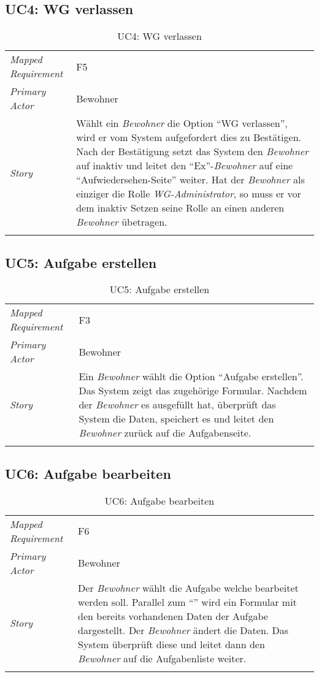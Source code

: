 \subsection{UC4: WG verlassen}\label{subsec:uc4}
\begin{table}[H]
	\tablestyle
	\tablealtcolored
	\begin{tabularx}{\textwidth}{lX}
		\tablebody
			\textit{Mapped Requirement} &
			F5
			\tabularnewline
			\textit{Primary Actor} &
			Bewohner
			\tabularnewline
			\textit{Story} &
			Wählt ein \emph{Bewohner} die Option ``WG verlassen'', wird er vom System aufgefordert dies zu Bestätigen. Nach der Bestätigung setzt das System den \emph{Bewohner} auf inaktiv und leitet den ``Ex''-\emph{Bewohner} auf eine ``Aufwiedersehen-Seite'' weiter. \newline
			Hat der \emph{Bewohner} als einziger die Rolle \emph{WG-Administrator}, so muss er vor dem inaktiv Setzen seine Rolle an einen anderen \emph{Bewohner} übetragen.
			\tabularnewline
		\tableend
	\end{tabularx}
	\caption{UC4: WG verlassen}
\end{table}


\subsection{UC5: Aufgabe erstellen}\label{subsec:uc5}
\begin{table}[H]
	\tablestyle
	\tablealtcolored
	\begin{tabularx}{\textwidth}{lX}
		\tablebody
			\textit{Mapped Requirement} &
			F3
			\tabularnewline
			\textit{Primary Actor} &
			Bewohner
			\tabularnewline
			\textit{Story} &
			Ein \emph{Bewohner} wählt die Option ``Aufgabe erstellen''. Das System zeigt das zugehörige Formular. Nachdem der \emph{Bewohner} es ausgefüllt hat, überprüft das System die Daten, speichert es und leitet den \emph{Bewohner} zurück auf die Aufgabenseite.
			\tabularnewline
		\tableend
	\end{tabularx}
	\caption{UC5: Aufgabe erstellen}
\end{table}


\subsection{UC6: Aufgabe bearbeiten}\label{subsec:uc6}
\begin{table}[H]
	\tablestyle
	\tablealtcolored
	\begin{tabularx}{\textwidth}{lX}
		\tablebody
			\textit{Mapped Requirement} &
			F6
			\tabularnewline
			\textit{Primary Actor} &
			Bewohner
			\tabularnewline
			\textit{Story} &
			Der \emph{Bewohner} wählt die Aufgabe welche bearbeitet werden soll. Parallel zum ``\nameref{subsec:uc5}'' wird ein Formular mit den bereits vorhandenen Daten der Aufgabe dargestellt. Der \emph{Bewohner} ändert die Daten. Das System überprüft diese und leitet dann den \emph{Bewohner} auf die Aufgabenliste weiter.
			\tabularnewline
		\tableend
	\end{tabularx}
	\caption{UC6: Aufgabe bearbeiten}
\end{table}


